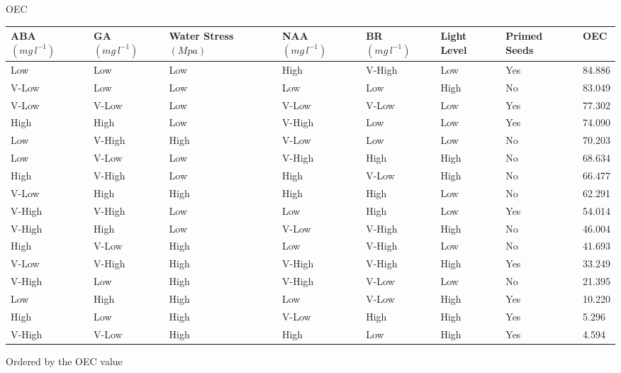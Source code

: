 \documentclass[10pt]{beamer}
\begin{document}
\begin{frame}{OEC}
  \begin{table}[htpb]\scriptsize
  \centering
  \begin{tabular}{p{1cm}  p{1cm}   p{1cm}  p{1cm}   p{1cm}  p{1cm}   p{1cm} | p{0.8cm} }
  \hline
  \textbf{ABA  $(mg\, l^{-1})$}   & \textbf{GA  $(mg\, l^{-1})$}  & \textbf{Water Stress  $(Mpa)$}  & \textbf{NAA  $(mg\, l^{-1})$}  & \textbf{BR  $(mg\, l^{-1})$} & \textbf{Light Level} & \textbf{Primed Seeds} & \textbf{OEC}\\
  \hline
  Low   &    Low   &    Low   &    High   &    V-High   &    Low   &    Yes   &    84.886\\
  V-Low   &    Low   &    Low   &    Low   &    Low   &    High   &    No   &    83.049\\
  V-Low   &    V-Low   &    Low   &    V-Low   &    V-Low   &    Low   &    Yes   &    77.302\\
  High   &    High   &    Low   &    V-High   &    Low   &    Low   &    Yes   &    74.090\\
  Low   &    V-High   &    High   &    V-Low   &    Low   &    Low   &    No   &    70.203\\
  Low   &    V-Low   &    Low   &    V-High   &    High   &    High   &    No   &    68.634\\
  High   &    V-High   &    Low   &    High   &    V-Low   &    High   &    No   &    66.477\\
  V-Low   &    High   &    High   &    High   &    High   &    Low   &    No   &    62.291\\
  V-High   &    V-High   &    Low   &    Low   &    High   &    Low   &    Yes   &    54.014\\
  V-High   &    High   &    Low   &    V-Low   &    V-High   &    High   &    No   &    46.004\\
  High   &    V-Low   &    High   &    Low   &    V-High   &    Low   &    No   &    41.693\\
  V-Low   &    V-High   &    High   &    V-High   &    V-High   &    High   &    Yes   &    33.249\\
  V-High   &    Low   &    High   &    V-High   &    V-Low   &    Low   &    No   &    21.395\\
  Low   &    High   &    High   &    Low   &    V-Low   &    High   &    Yes   &    10.220\\
  High   &    Low   &    High   &    V-Low   &    High   &    High   &    Yes   &    5.296\\
  V-High	 & 	V-Low&	High&		High&		Low&		High&		Yes&		4.594\\
  \hline
  \end{tabular}
  \end{table}
  	Ordered by the OEC value
\end{frame}
\end{document}
